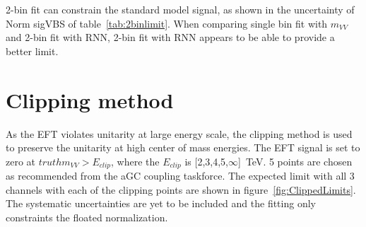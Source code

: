 \begin{table}[ht!]
\small
\begin{center}
\caption{Expected signal strength and limits in each two options. only \tlep channel is used for the fit. The result for single bin fit with RNN is also shown as a reference. The normarizations fitted for standard model signal, and Z and diboson backgrounds are shown as Norm in the table.}
\label{tab:2binlimit}
\end{center}
\end{table}

2-bin fit can constrain the standard model signal, as shown in the uncertainty of Norm sigVBS of table~\ref{tab:2binlimit}. 
When comparing single bin fit with $m_{VV}$ and 2-bin fit with RNN, 2-bin fit with RNN appears to be able to provide a better limit.

\section{Clipping method}
\label{subsec:clipping}
As the EFT violates unitarity at large energy scale, the clipping method is used to preserve the unitarity at high center of mass energies. The EFT signal is set to zero at $truth m_{VV} > E_{clip}$, where the $E_{clip}$ is [2,3,4,5,$\infty$]~TeV. 5 points are chosen as recommended from the aGC coupling taskforce.\cite{ATL-COM-PHYS-2017-433} 
The expected limit with all 3 channels with each of the clipping points are shown in figure~\ref{fig:ClippedLimits}. 
The systematic uncertainties are yet to be included and the fitting only constraints the floated normalization.

